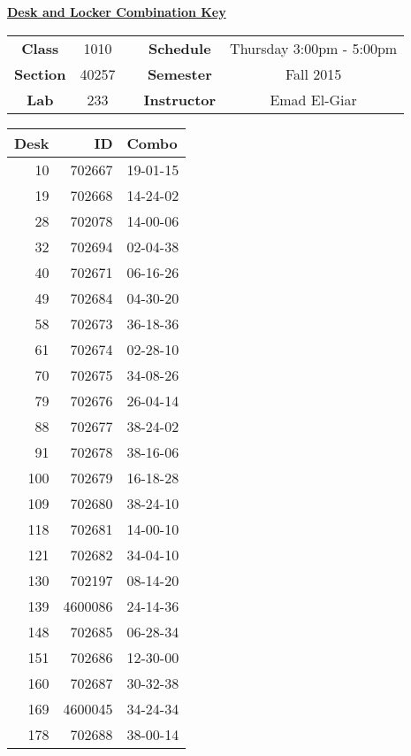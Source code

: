 \documentclass[12pt]{article}
\begin{document}
\thispagestyle{empty}

\begin{center}
	{\huge\textbf{\underline{ Desk and Locker Combination Key}}}
\end{center}


\begin{table}[h]
  \centering
  \begin{tabular}{ccccc}

  \textbf{Class} & 1010 & {\qquad} &\textbf{Schedule} & Thursday 3:00pm - 5:00pm \\
  \textbf{Section} & 40257 & {\qquad} & \textbf{Semester} & Fall 2015 \\
  \textbf{Lab} & 233 & {\qquad} & \textbf{Instructor} & Emad El-Giar \\
  \end{tabular}
\end{table}
 \vspace{0.5in}
\begin{minipage}{0.4\textwidth}

\begin{tabular}{rrl}
\toprule
 Desk &       ID &     Combo \\
\midrule
   10 &   702667 &  19-01-15 \\
   19 &   702668 &  14-24-02 \\
   28 &   702078 &  14-00-06 \\
   32 &   702694 &  02-04-38 \\
   40 &   702671 &  06-16-26 \\
   49 &   702684 &  04-30-20 \\
   58 &   702673 &  36-18-36 \\
   61 &   702674 &  02-28-10 \\
   70 &   702675 &  34-08-26 \\
   79 &   702676 &  26-04-14 \\
   88 &   702677 &  38-24-02 \\
   91 &   702678 &  38-16-06 \\
  100 &   702679 &  16-18-28 \\
  109 &   702680 &  38-24-10 \\
  118 &   702681 &  14-00-10 \\
  121 &   702682 &  34-04-10 \\
  130 &   702197 &  08-14-20 \\
  139 &  4600086 &  24-14-36 \\
  148 &   702685 &  06-28-34 \\
  151 &   702686 &  12-30-00 \\
  160 &   702687 &  30-32-38 \\
  169 &  4600045 &  34-24-34 \\
  178 &   702688 &  38-00-14 \\
\bottomrule
\end{tabular}


\end{minipage}
\end{document}
